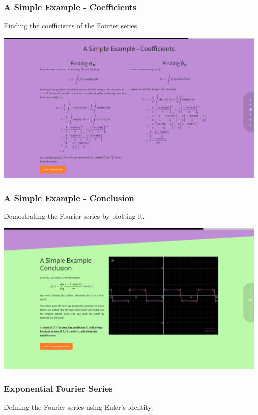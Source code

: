 \documentclass{article}
\begin{document}
\subsubsection{A Simple Example - Coefficients}

Finding the coefficients of the Fourier series.

\includegraphics[width=\textwidth]{chap13.png}

\subsubsection{A Simple Example - Conclusion}

Demostrating the Fourier series by plotting it.

\includegraphics[width=\textwidth]{chap14.png}

\subsubsection{Exponential Fourier Series}

Defining the Fourier series using Euler's Identity.
\end{document}
